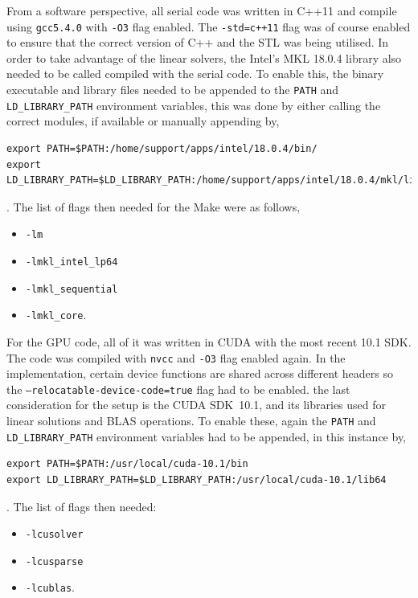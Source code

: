 From a software perspective, all serial code was written in C++11 and compile using \texttt{gcc5.4.0} with \texttt{-O3} flag enabled. The \texttt{-std=c++11} flag was of course enabled to ensure that the correct version of C++ and the STL was being utilised. In order to take advantage of the linear solvers, the Intel's MKL 18.0.4 library also needed to be called compiled with the serial code. To enable this, the binary executable and library files needed to be appended to the \texttt{PATH} and \texttt{LD\_LIBRARY\_PATH} environment variables, this was done by either calling the correct modules, if available or manually appending by,
\begin{lstlisting}[style = bashStyle]
export PATH=$PATH:/home/support/apps/intel/18.0.4/bin/
export LD_LIBRARY_PATH=$LD_LIBRARY_PATH:/home/support/apps/intel/18.0.4/mkl/lib/intel64/intel64/
\end{lstlisting}
. The list of flags then needed for the Make were as follows,
\begin{itemize}
	\item \texttt{-lm}
	\item \texttt{-lmkl\_intel\_lp64}
	\item \texttt{-lmkl\_sequential}
	\item \texttt{-lmkl\_core}.
\end{itemize}

For the GPU code, all of it was written in CUDA with the most recent 10.1 SDK. The code was compiled with \texttt{nvcc} and \texttt{-O3} flag enabled again. In the implementation, certain device functions are shared across different headers so the \texttt{--relocatable-device-code=true} flag had to be enabled. the last consideration for the setup is the CUDA SDK~10.1, and its libraries used for linear solutions and BLAS operations. To enable these, again the \texttt{PATH} and \texttt{LD\_LIBRARY\_PATH} environment variables had to be appended, in this instance by,
\begin{lstlisting}[style = bashStyle]
export PATH=$PATH:/usr/local/cuda-10.1/bin
export LD_LIBRARY_PATH=$LD_LIBRARY_PATH:/usr/local/cuda-10.1/lib64
\end{lstlisting}
. The list of flags then needed:
\begin{itemize}
	\item \texttt{-lcusolver}
	\item \texttt{-lcusparse}
	\item \texttt{-lcublas}.
\end{itemize}

